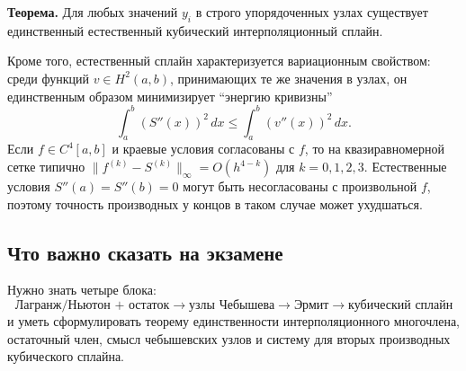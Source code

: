 \textbf{Теорема.} Для любых значений $y_i$ в строго упорядоченных узлах существует единственный естественный кубический интерполяционный сплайн.

Кроме того, естественный сплайн характеризуется вариационным свойством: среди функций $v\in H^2(a,b)$, принимающих те же значения в узлах, он единственным образом минимизирует ``энергию кривизны''
\[
\boxed{
\int_a^b (S''(x))^2\,dx
\le
\int_a^b (v''(x))^2\,dx.
}
\]
Если $f\in C^4[a,b]$ и краевые условия согласованы с $f$, то на квазиравномерной сетке типично $\|f^{(k)}-S^{(k)}\|_\infty=O(h^{4-k})$ для $k=0,1,2,3$. Естественные условия $S''(a)=S''(b)=0$ могут быть несогласованы с произвольной $f$, поэтому точность производных у концов в таком случае может ухудшаться.

\subsection{Что важно сказать на экзамене}

Нужно знать четыре блока:
\[
\boxed{
\text{Лагранж/Ньютон + остаток}
\rightarrow
\text{узлы Чебышева}
\rightarrow
\text{Эрмит}
\rightarrow
\text{кубический сплайн}}
\]
и уметь сформулировать теорему единственности интерполяционного многочлена, остаточный член, смысл чебышевских узлов и систему для вторых производных кубического сплайна.

\newpage
